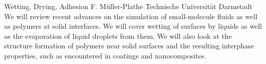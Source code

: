 
    \begin{abstract_online}{Wetting, Drying, Adhesion}{%
        F. Müller-Plathe}{%
        \KLtag}{%
        Technische Universität Darmstadt}
    We will review recent advances on the simulation of small-molecule  fluids as well as polymers at solid interfaces. We will cover wetting of surfaces by liquids as well as the evaporation of liquid droplets from  them. We will also look at the structure formation of polymers near  solid surfaces and the resulting interphase properties, such as  encountered in coatings and nanocomposites.  
    
    \end{abstract_online}
    